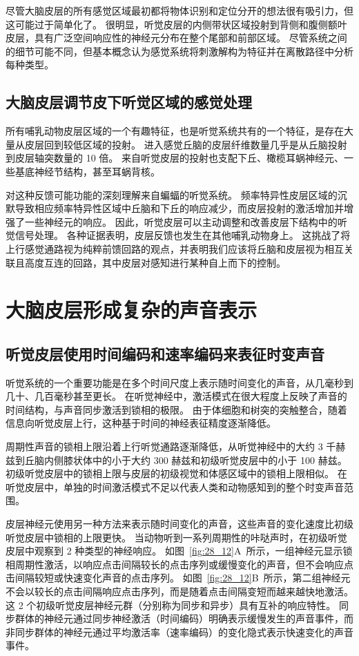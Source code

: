 尽管大脑皮层的所有感觉区域最初都将物体识别和定位分开的想法很有吸引力，但这可能过于简单化了。
很明显，听觉皮层的内侧带状区域投射到背侧和腹侧额叶皮层，具有广泛空间响应性的神经元分布在整个尾部和前部区域。
尽管系统之间的细节可能不同，但基本概念认为感觉系统将刺激解构为特征并在离散路径中分析每种类型。



\subsection{大脑皮层调节皮下听觉区域的感觉处理}

所有哺乳动物皮层区域的一个有趣特征，也是听觉系统共有的一个特征，是存在大量从皮层回到较低区域的投射。
进入感觉丘脑的皮层纤维数量几乎是从丘脑投射到皮层轴突数量的 10 倍。
来自听觉皮层的投射也支配下丘、橄榄耳蜗神经元、一些基底神经节结构，甚至耳蜗背核。


对这种反馈可能功能的深刻理解来自蝙蝠的听觉系统。
频率特异性皮层区域的沉默导致相应频率特异性区域中丘脑和下丘的响应减少，而皮层投射的激活增加并增强了一些神经元的响应。
因此，听觉皮层可以主动调整和改善皮层下结构中的听觉信号处理。
各种证据表明，皮层反馈也发生在其他哺乳动物身上。
这挑战了将上行感觉通路视为纯粹前馈回路的观点，并表明我们应该将丘脑和皮层视为相互关联且高度互连的回路，其中皮层对感知进行某种自上而下的控制。



\section{大脑皮层形成复杂的声音表示}


\subsection{听觉皮层使用时间编码和速率编码来表征时变声音}

听觉系统的一个重要功能是在多个时间尺度上表示随时间变化的声音，从几毫秒到几十、几百毫秒甚至更长。
在听觉神经中，激活模式在很大程度上反映了声音的时间结构，与声音同步激活到锁相的极限。
由于体细胞和树突的突触整合，随着信息向听觉皮层上行，这种基于时间的神经表征精度逐渐降低。


周期性声音的锁相上限沿着上行听觉通路逐渐降低，从听觉神经中的大约 3 千赫兹到丘脑内侧膝状体中的小于大约 300 赫兹和初级听觉皮层中的小于 100 赫兹。
初级听觉皮层中的锁相上限与皮层的初级视觉和体感区域中的锁相上限相似。
在听觉皮层中，单独的时间激活模式不足以代表人类和动物感知到的整个时变声音范围。


皮层神经元使用另一种方法来表示随时间变化的声音，这些声音的变化速度比初级听觉皮层中锁相的上限更快。
当动物听到一系列周期性的咔哒声时，在初级听觉皮层中观察到 2 种类型的神经响应。
如图~\ref{fig:28_12}A~所示，一组神经元显示锁相周期性激活，以响应点击间隔较长的点击序列或缓慢变化的声音，但不会响应点击间隔较短或快速变化声音的点击序列。
如图~\ref{fig:28_12}B~所示，第二组神经元不会以较长的点击间隔响应点击序列，而是随着点击间隔变短而越来越快地激活。
这 2 个初级听觉皮层神经元群（分别称为同步和异步）具有互补的响应特性。
同步群体的神经元通过同步神经激活（时间编码）明确表示缓慢发生的声音事件，而非同步群体的神经元通过平均激活率（速率编码）的变化隐式表示快速变化的声音事件。


